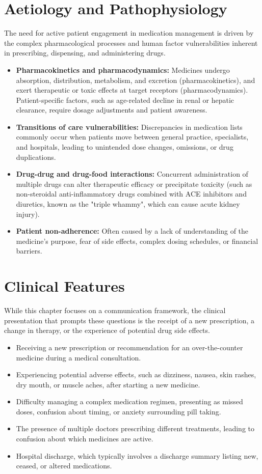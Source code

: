 \section*{Aetiology and Pathophysiology}
The need for active patient engagement in medication management is driven by the complex pharmacological processes and human factor vulnerabilities inherent in prescribing, dispensing, and administering drugs.
\begin{itemize}
    \item \textbf{Pharmacokinetics and pharmacodynamics:} Medicines undergo absorption, distribution, metabolism, and excretion (pharmacokinetics), and exert therapeutic or toxic effects at target receptors (pharmacodynamics). Patient-specific factors, such as age-related decline in renal or hepatic clearance, require dosage adjustments and patient awareness.
    \item \textbf{Transitions of care vulnerabilities:} Discrepancies in medication lists commonly occur when patients move between general practice, specialists, and hospitals, leading to unintended dose changes, omissions, or drug duplications.
    \item \textbf{Drug-drug and drug-food interactions:} Concurrent administration of multiple drugs can alter therapeutic efficacy or precipitate toxicity (such as non-steroidal anti-inflammatory drugs combined with ACE inhibitors and diuretics, known as the "triple whammy", which can cause acute kidney injury).
    \item \textbf{Patient non-adherence:} Often caused by a lack of understanding of the medicine's purpose, fear of side effects, complex dosing schedules, or financial barriers.
\end{itemize}

\section*{Clinical Features}
While this chapter focuses on a communication framework, the clinical presentation that prompts these questions is the receipt of a new prescription, a change in therapy, or the experience of potential drug side effects.
\begin{itemize}
    \item Receiving a new prescription or recommendation for an over-the-counter medicine during a medical consultation.
    \item Experiencing potential adverse effects, such as dizziness, nausea, skin rashes, dry mouth, or muscle aches, after starting a new medicine.
    \item Difficulty managing a complex medication regimen, presenting as missed doses, confusion about timing, or anxiety surrounding pill taking.
    \item The presence of multiple doctors prescribing different treatments, leading to confusion about which medicines are active.
    \item Hospital discharge, which typically involves a discharge summary listing new, ceased, or altered medications.
\end{itemize}

